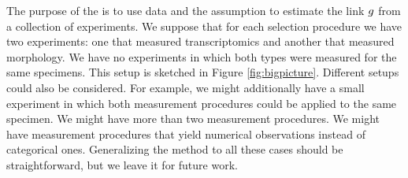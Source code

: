 The purpose of the \MLM{} is to use data and the \MLM{} assumption to estimate the link $g$ from a collection of experiments.  We suppose that for each selection procedure we have two experiments: one that measured transcriptomics and another that measured morphology.  We have no experiments in which both types were measured for the same specimens.  This setup is sketched in Figure \ref{fig:bigpicture}.  Different setups could also be considered.   For example, we might additionally have a small experiment in which both measurement procedures could be applied to the same specimen.  We might have more than two measurement procedures.  We might have measurement procedures that yield numerical observations instead of categorical ones.  Generalizing the method to all these cases should be straightforward, but we leave it for future work.  

